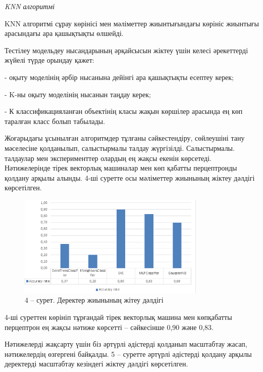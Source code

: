 \begin{multicols}{2}
\emph{KNN алгоритмі}

KNN алгоритмі сұрау көрінісі мен мәліметтер жиынтығындағы көрініс
жиынтығы арасындағы ара қашықтықты өлшейді.

Тестілеу модельдеу нысандарының әрқайсысын жіктеу үшін келесі
әрекеттерді жүйелі түрде орындау қажет:

- оқыту моделінің әрбір нысанына дейінгі ара қашықтықты есептеу керек;

- K-ны оқыту моделінің нысанын таңдау керек;

- К классификацияланған объектінің класы жақын көршілер арасында ең көп
таралған класс болып табылады.

Жоғарыдағы ұсынылған алгоритмдер тұлғаны сәйкестендіру, сөйлеушіні тану
мәселесіне қолданылып, салыстырмалы талдау жүргізілді. Салыстырмалы.
талдаулар мен эксперименттер олардың ең жақсы екенін көрсетеді.
Нәтижелерінде тірек векторлық машиналар мен көп қабатты перцептронды
қолдану арқылы алынды. 4-ші суретте осы мәліметтер жиынының жіктеу
дәлдігі көрсетілген.
\end{multicols}

\begin{figure}[H]
	\centering
	\includegraphics[width=0.8\textwidth]{media/ict/image8}
	\caption*{4 -- сурет. Деректер жиынының жітеу дәлдігі}
\end{figure}

\begin{multicols}{2}
4-ші суреттен көрініп тұрғандай тірек векторлық машина мен көпқабатты
перцептрон ең жақсы нәтиже көрсетті -- сәйкесінше 0,90 және 0,83.

Нәтижелерді жақсарту үшін біз әртүрлі әдістерді қолданып масштабтау
жасап, нәтижелердің өзгергені байқалды. 5 -- суретте әртүрлі әдістерді
қолдану арқылы деректерді масштабтау кезіндегі жіктеу дәлдігі
көрсетілген.
\end{multicols}

